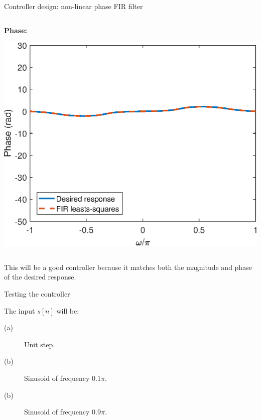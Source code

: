\documentclass[10pt]{beamer}
\begin{document}
\begin{frame}{Controller design: non-linear phase FIR filter}
\begin{columns}
	\begin{column}{0.45\textwidth}
		\textbf{Phase:}	
		\begin{center}
			\includegraphics[width=\textwidth]{../homework/figs/inverse_control_controller_nonlinear_phase_phase.eps}
		\end{center}
	\end{column}
\end{columns}

This will be a good controller because it matches both the magnitude and phase of the desired response.

\end{frame}

%
\begin{frame}{Testing the controller}
\begin{center}
	\resizebox{0.7\textwidth}{!}{}
\end{center}

The input $s[n]$ will be:
\begin{description}
	\item[(a)] Unit step. 
	\item[(b)] Sinusoid of frequency $0.1\pi$.
	\item[(b)] Sinusoid of frequency $0.9\pi$. 
\end{description}

\end{frame}
\end{document}
